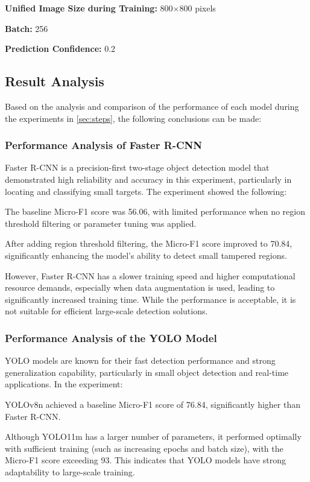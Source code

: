 \noindent
\textbf{Unified Image Size during Training:} 800$\times$800 pixels

\noindent
\textbf{Batch:} 256

\noindent
\textbf{Prediction Confidence:} 0.2

\subsection{Result Analysis}

Based on the analysis and comparison of the performance of each model during the experiments in \cref{sec:steps}, the following conclusions can be made:

\subsubsection{Performance Analysis of Faster R-CNN}
Faster R-CNN is a precision-first two-stage object detection model that demonstrated high reliability and accuracy in this experiment, particularly in locating and classifying small targets. The experiment showed the following:

The baseline Micro-F1 score was 56.06, with limited performance when no region threshold filtering or parameter tuning was applied.

After adding region threshold filtering, the Micro-F1 score improved to 70.84, significantly enhancing the model's ability to detect small tampered regions.

However, Faster R-CNN has a slower training speed and higher computational resource demands, especially when data augmentation is used, leading to significantly increased training time. While the performance is acceptable, it is not suitable for efficient large-scale detection solutions.

\subsubsection{Performance Analysis of the YOLO Model}
YOLO models are known for their fast detection performance and strong generalization capability, particularly in small object detection and real-time applications. In the experiment:

YOLOv8n achieved a baseline Micro-F1 score of 76.84, significantly higher than Faster R-CNN.

Although YOLO11m has a larger number of parameters, it performed optimally with sufficient training (such as increasing epochs and batch size), with the Micro-F1 score exceeding 93. This indicates that YOLO models have strong adaptability to large-scale training.

